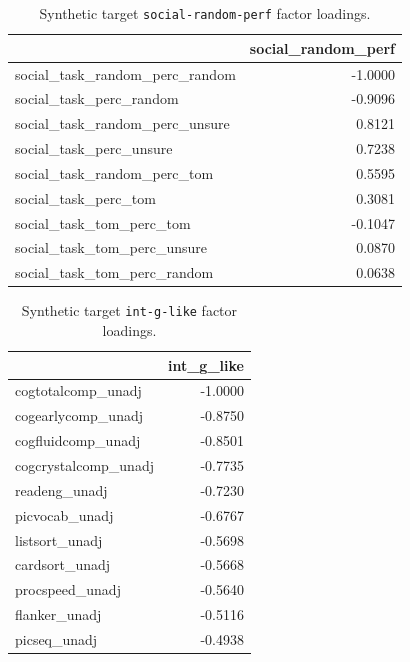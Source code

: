 \documentclass{article}
\begin{document}
\begin{table}[H]
\caption{Synthetic target \texttt{social-random-perf} factor loadings.}\label{tab:social-random-perf}
\centering
\begin{tabular}{lr}
\toprule
 & social\_random\_perf \\
\midrule
social\_task\_random\_perc\_random & -1.0000 \\
social\_task\_perc\_random & -0.9096 \\
social\_task\_random\_perc\_unsure & 0.8121 \\
social\_task\_perc\_unsure & 0.7238 \\
social\_task\_random\_perc\_tom & 0.5595 \\
social\_task\_perc\_tom & 0.3081 \\
social\_task\_tom\_perc\_tom & -0.1047 \\
social\_task\_tom\_perc\_unsure & 0.0870 \\
social\_task\_tom\_perc\_random & 0.0638 \\
\bottomrule
\end{tabular}

\end{table}


\begin{table}[H]
\caption{Synthetic target \texttt{int-g-like} factor loadings.}\label{tab:int-g-like}
\centering
\begin{tabular}{lr}
\toprule
 & int\_g\_like \\
\midrule
cogtotalcomp\_unadj & -1.0000 \\
cogearlycomp\_unadj & -0.8750 \\
cogfluidcomp\_unadj & -0.8501 \\
cogcrystalcomp\_unadj & -0.7735 \\
readeng\_unadj & -0.7230 \\
picvocab\_unadj & -0.6767 \\
listsort\_unadj & -0.5698 \\
cardsort\_unadj & -0.5668 \\
procspeed\_unadj & -0.5640 \\
flanker\_unadj & -0.5116 \\
picseq\_unadj & -0.4938 \\
\bottomrule
\end{tabular}

\end{table}
\end{document}
